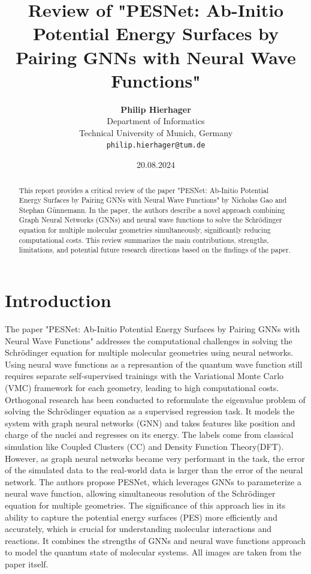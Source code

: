 \documentclass{article}
\title{Review of "PESNet: Ab-Initio Potential Energy Surfaces by Pairing GNNs with Neural Wave Functions"}
\author{\textbf{Philip Hierhager}\\Department of Informatics\\Technical University of Munich, Germany\\
\texttt{philip.hierhager@tum.de}
}
\date{20.08.2024}
\begin{document}
\maketitle

\begin{abstract}
    This report provides a critical review of the paper "PESNet: Ab-Initio Potential Energy Surfaces by Pairing GNNs with Neural Wave Functions" by Nicholas Gao and Stephan Günnemann. In the paper, the authors describe a novel approach combining Graph Neural Networks (GNNs) and neural wave functions to solve the Schrödinger equation for multiple molecular geometries simultaneously, significantly reducing computational costs. This review summarizes the main contributions, strengths, limitations, and potential future research directions based on the findings of the paper.
\end{abstract}

\section{Introduction}
The paper "PESNet: Ab-Initio Potential Energy Surfaces by Pairing GNNs with Neural Wave Functions" addresses the computational challenges in solving the Schrödinger equation for multiple molecular geometries using neural networks. Using neural wave functions as a represantion of the quantum wave function still requires separate self-supervised trainings with the Variational Monte Carlo (VMC) framework for each geometry, leading to high computational costs. Orthogonal research has been conducted to reformulate the eigenvalue problem of solving the Schrödinger equation as a supervised regression task. It models the system with graph neural networks (GNN) and takes features like position and charge of the nuclei and regresses on its energy. The labels come from classical simulation like Coupled Clusters (CC) and Density Function Theory(DFT). However, as graph neural networks became very performant in the task, the error of the simulated data to the real-world data is larger than the error of the neural network. The authors propose PESNet, which leverages GNNs to parameterize a neural wave function, allowing simultaneous resolution of the Schrödinger equation for multiple geometries. The significance of this approach lies in its ability to capture the potential energy surfaces (PES) more efficiently and accurately, which is crucial for understanding molecular interactions and reactions. It combines the strengths of GNNs and neural wave functions approach to model the quantum state of molecular systems. All images are taken from the paper itself.
\end{document}
